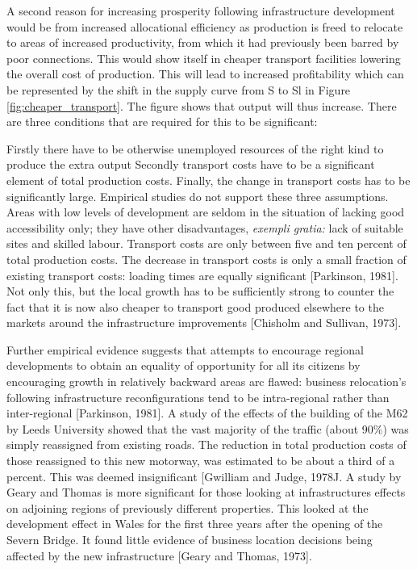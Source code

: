 

A second reason for increasing prosperity following infrastructure development would be from increased allocational efficiency as production is freed to relocate to areas of increased productivity, from which it had previously been barred by poor connections. This would show itself in cheaper transport facilities lowering the overall cost of production. This will lead to increased profitability which can be represented by the shift in the supply curve from S to Sl in Figure \ref{fig:cheaper_transport}. The figure shows that output will thus increase. There are three conditions that are required for this to be significant:

Firstly there have to be otherwise unemployed resources of the right kind to produce the extra output Secondly transport costs have to be a significant element of total production costs. Finally, the change in transport costs has to be significantly large. Empirical studies do not support these three assumptions. Areas with low levels of development are seldom in the situation of lacking good accessibility only; they have other disadvantages, \textit{exempli gratia:} lack of suitable sites and skilled labour. Transport costs are only between five and ten percent of total production costs. The decrease in transport costs is only a small fraction of existing transport costs: loading times are equally significant [Parkinson, 1981]. Not only this, but the local growth has to be sufficiently strong to counter the fact that it is now also cheaper to transport good produced elsewhere to the markets around the infrastructure improvements [Chisholm and Sullivan, 1973].

Further empirical evidence suggests that attempts to encourage regional developments to obtain an equality of opportunity for all its citizens by encouraging growth in relatively backward areas arc flawed: business relocation's following infrastructure reconfigurations tend to be intra-regional rather than inter-regional [Parkinson, 1981]. A study of the effects of the building of the M62 by Leeds University showed that the vast majority of the traffic (about 90\%) was simply reassigned from existing roads. The reduction in total production costs of those reassigned to this new motorway, was estimated to be about a third of a percent. This was deemed insignificant [Gwilliam and Judge, 1978J. A study by Geary and Thomas is more significant for those looking at infrastructures effects on adjoining regions of previously different properties. This looked at the development effect in Wales for the first three years after the opening of the Severn Bridge. It found little evidence of business location decisions being affected by the new infrastructure [Geary and Thomas, 1973].

